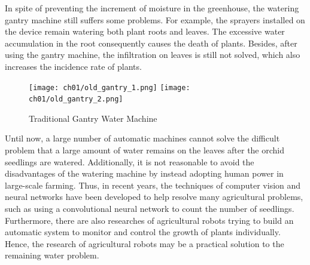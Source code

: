 In spite of preventing the increment of moisture in the greenhouse, the watering gantry machine still suffers some problems. For example, the sprayers installed on the device remain watering both plant roots and leaves. The excessive water accumulation in the root consequently causes the death of plants. Besides, after using the gantry machine, the infiltration on leaves is still not solved, which also increases the incidence rate of plants.

\begin{figure}[ht]
    \centering
    \texttt{[image: ch01/old\_gantry\_1.png]}
    \texttt{[image: ch01/old\_gantry\_2.png]}
    \caption{Traditional Gantry Water Machine}
    \label{fig:old_gantry}
\end{figure}

Until now, a large number of automatic machines cannot solve the difficult problem that a large amount of water remains on the leaves after the orchid seedlings are watered. Additionally, it is not reasonable to avoid the disadvantages of the watering machine by instead adopting human power in large-scale farming. Thus, in recent years, the techniques of computer vision and neural networks have been developed to help resolve many agricultural problems, such as using a convolutional neural network to count the number of seedlings\cite{jausih_2020}. Furthermore, there are also researches of agricultural robots trying to build an automatic system to monitor and control the growth of plants individually. Hence, the research of agricultural robots may be a practical solution to the remaining water problem.